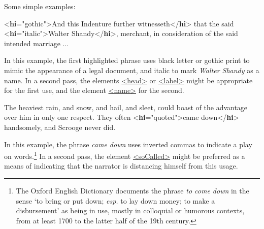 Some simple examples: \par\bgroup{}\exampleFont \begin{shaded}\noindent\mbox{}{<\textbf{hi}\hspace*{1em}{rend}="{gothic}">}And this Indenture further witnesseth{</\textbf{hi}>}\mbox{}\newline 
 that the said {<\textbf{hi}\hspace*{1em}{rend}="{italic}">}Walter Shandy{</\textbf{hi}>}, merchant,\mbox{}\newline 
 in consideration of the said intended marriage ...\end{shaded}\egroup\par \noindent  In this example, the first highlighted phrase uses black letter or gothic print to mimic the appearance of a legal document, and italic to mark \textit{Walter Shandy} as a name. In a second pass, the elements \hyperref[TEI.head]{<head>} or \hyperref[TEI.label]{<label>} might be appropriate for the first use, and the element \hyperref[TEI.name]{<name>} for the second. \par\bgroup{}\exampleFont \begin{shaded}\noindent\mbox{}The heaviest rain, and snow, and hail, and\mbox{}\newline 
 sleet, could boast of the advantage over him in only one respect. They\mbox{}\newline 
 often {<\textbf{hi}\hspace*{1em}{rend}="{quoted}">}came down{</\textbf{hi}>} handsomely, and Scrooge never\mbox{}\newline 
 did.\end{shaded}\egroup\par \noindent  In this example, the phrase \textit{came down} uses inverted commas to indicate a play on words.\footnote{The Oxford English Dictionary documents the phrase \textit{to come down} in the sense ‘to bring or put down; {\itshape esp.} to lay down money; to make a disbursement’ as being in use, mostly in colloquial or humorous contexts, from at least 1700 to the latter half of the 19th century.} In a second pass, the element \hyperref[TEI.soCalled]{<soCalled>} might be preferred as a means of indicating that the narrator is distancing himself from this usage.
